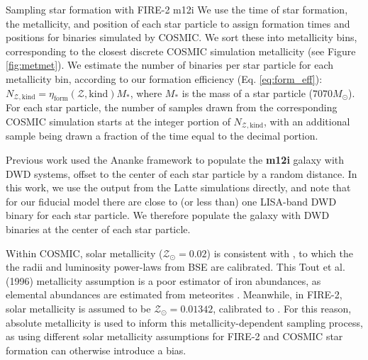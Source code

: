 \documentclass[twocolumn]{aastex631}
\newcommand*{\metallicity}{\mathcal{Z}}
\newcommand*{\msun}{M_{\odot}}
\newcommand*{\zsun}{\metallicity_{\odot}}
\begin{document}
\begin{subsection}{Sampling star formation with FIRE-2 m12i}
We use the time of star formation,
    the metallicity, and position of each star particle 
    to assign formation times and positions for binaries simulated by COSMIC.
We sort these into metallicity bins,
    corresponding to the closest discrete COSMIC simulation metallicity
    (see Figure \ref{fig:metmet}).
We estimate the number of binaries per star particle
    for each metallicity bin, according to our formation efficiency
    (Eq. \ref{eq:form_eff}):
    $N_{\metallicity, \mathrm{kind}} = \eta_{\mathrm{form}}(\metallicity,\mathrm{kind}) M_{*}$,
    where $M_{*}$ is the mass of a star particle ($7070 \msun$).
For each star particle, the number of samples drawn from the corresponding
    COSMIC simulation starts at the integer portion of
    $N_{\metallicity, \mathrm{kind}}$, with an additional sample being
    drawn a fraction of the time equal to the decimal portion.

Previous work \citep{Thiele2023} used the Ananke framework \citep{Sanderson2020}
    to populate the \textbf{m12i} galaxy with DWD systems,
    offset to the center of each star particle by a random distance.
In this work, we use the output from the Latte simulations directly,
    and note that for our fiducial model there are close to (or less than)
    one LISA-band DWD binary for each star particle.
We therefore populate the galaxy with DWD binaries
    at the center of each star particle.

Within COSMIC, solar metallicity ($\zsun=0.02$)
    is consistent with \citet{Tout1996},
    to which the the radii and luminosity power-laws from BSE are calibrated.
This Tout et al. (1996) metallicity assumption is a poor estimator of
    iron abundances, as elemental abundances are estimated from meteorites
    \citep{Anders1989}.
Meanwhile, in FIRE-2, solar metallicity is assumed to be $\zsun=0.01342$,
    calibrated to \citet{Asplund2009}.
For this reason, absolute metallicity is used to inform
    this metallicity-dependent sampling process,
    as using different solar metallicity assumptions for
    FIRE-2 and COSMIC star formation can otherwise introduce a bias. 
\end{subsection}
\end{document}
